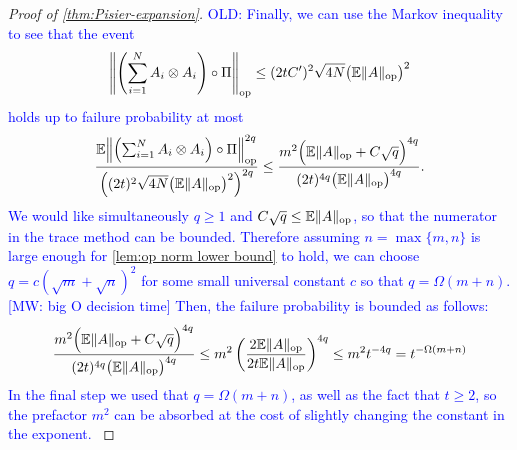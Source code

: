 \documentclass[aos]{imsart}
\theoremstyle{definition}
\numberwithin{equation}{section}
\DeclareMathOperator{\op}{op}
\DeclarePairedDelimiter{\norm}{\lVert}{\rVert}
\newcommand{\E}{\mathbb{E}}
\newcommand{\MW}[1]{{\color{red}[MW: #1]}}
\begin{document}
\begin{appendix}
\begin{proof} [Proof of \cref{thm:Pisier-expansion}]
\textcolor{blue}{OLD: Finally, we can use the Markov inequality to see that the event
\begin{align*}
  \norm*{\left(\sum_{i=1}^N A_i \otimes A_i \right) \circ \Pi}_{\op} \leq (2 t C')^2 \sqrt{4 N} \bigl( \E \norm{A}_{\op} \bigr)^2
\end{align*}
holds up to failure probability at most
\begin{align*}
  \frac{\E \norm*{\left(\sum_{i=1}^N A_i \otimes A_i \right) \circ \Pi}_{\op}^{2q}}{\left( (2 t)^2 \sqrt{4 N} \bigl( \E \norm{A}_{\op} \bigr)^2 \right)^{2q}}
\leq %
  \frac{m^2 \Bigl( \E\norm A_{\op} + C \sqrt{q} \Bigr)^{4q}}{(2 t)^{4q} \bigl( \E \norm{A}_{\op} \bigr)^{4q}}.
\end{align*}
We would like simultaneously $q \geq 1$ and $C \sqrt{q} \leq \E \norm A_{\op}$, so that the numerator in the trace method can be bounded. Therefore assuming $n = \max\{m,n\}$ is large enough for \cref{lem:op norm lower bound} to hold, we can choose $q = c(\sqrt{m} + \sqrt{n})^{2}$ for some small universal constant $c$ so that $q = \Omega(m + n)$.
\MW{big O decision time}
Then, the failure probability is bounded as follows:
\begin{align*}
  \frac{m^2 \Bigl( \E\norm A_{\op} + C \sqrt{q} \Bigr)^{4q}}{(2 t)^{4q} \bigl( \E \norm{A}_{\op} \bigr)^{4q}}
\leq
m^2 \left( \frac{2 \E\norm A_{\op}}{2 t \E\norm A_{\op}} \right)^{4q}
\leq m^2 t^{-4q}
= t^{-\Omega(m+n)}
\end{align*}
In the final step we used that $q = \Omega(m + n)$, as well as the fact that $t \geq 2$, so the prefactor $m^{2}$ can be absorbed at the cost of slightly changing the constant in the exponent. }


\end{proof}
\end{appendix}
\end{document}
